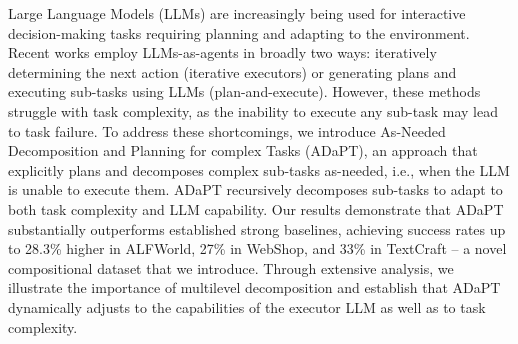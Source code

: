 Large Language Models (LLMs) are increasingly being used for interactive decision-making tasks requiring planning and adapting to the environment. Recent works employ LLMs-as-agents in broadly two ways: iteratively determining the next action (iterative executors) or generating plans and executing sub-tasks using LLMs (plan-and-execute). However, these methods struggle with task complexity, as the inability to execute any sub-task may lead to task failure. To address these shortcomings, we introduce As-Needed Decomposition and Planning for complex Tasks (ADaPT), an approach that explicitly plans and decomposes complex sub-tasks as-needed, i.e., when the LLM is unable to execute them. ADaPT recursively decomposes sub-tasks to adapt to both task complexity and LLM capability. Our results demonstrate that ADaPT substantially outperforms established strong baselines, achieving success rates up to 28.3\% higher in ALFWorld, 27\% in WebShop, and 33\% in TextCraft -- a novel compositional dataset that we introduce. Through extensive analysis, we illustrate the importance of multilevel decomposition and establish that ADaPT dynamically adjusts to the capabilities of the executor LLM as well as to task complexity.
